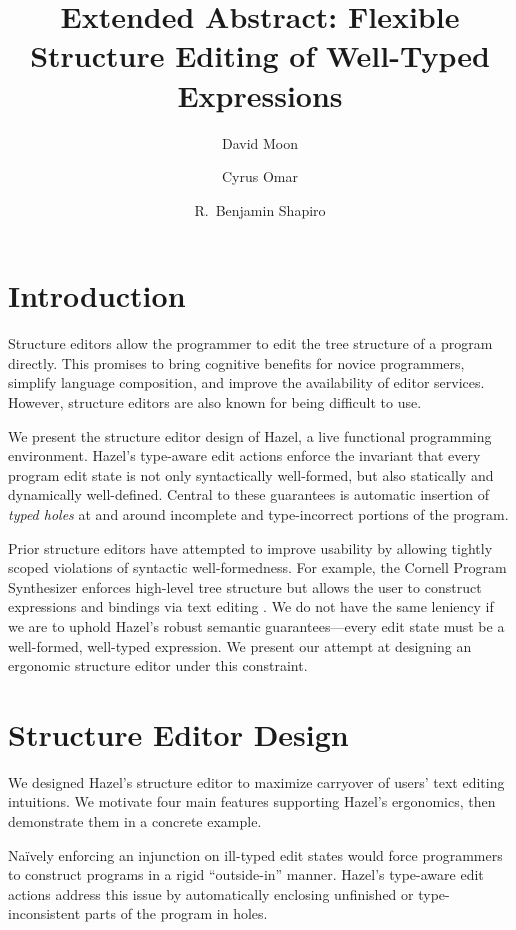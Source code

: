 \documentclass[format=sigplan,dvipsnames,backend=bibtex]{acmart}
\title{Extended Abstract: Flexible Structure Editing of Well-Typed Expressions}
\author{David Moon}
\affiliation{University of Colorado Boulder}
\author{Cyrus Omar}
\affiliation{University of Chicago}
\author{R.~Benjamin Shapiro}
\affiliation{University of Colorado Boulder}
\newcommand{\Hazel}{\textsf{Hazel}\xspace}
\begin{document}
\maketitle

\section{Introduction}

Structure editors allow the programmer to edit the tree structure of a program directly.
This promises to bring cognitive benefits for novice programmers, simplify language composition,
  and improve the availability of editor services.
However, structure editors are also known for being difficult to use.

We present the structure editor design of \Hazel, a live functional programming environment.
	\Hazel's type-aware edit actions enforce the invariant that every program edit state is not only syntactically 
	well-formed, but also statically \cite{Hazelnut} and dynamically \cite{HazelnutLive}
	well-defined.
Central to these guarantees is automatic insertion of \emph{typed holes} at and around 
	incomplete and type-incorrect portions of the program.
	
Prior structure editors have attempted to improve usability by allowing tightly scoped 
	violations of syntactic well-formedness.
For example, the Cornell Program Synthesizer enforces high-level tree structure but
	allows the user to construct expressions and bindings via text editing \cite{Cornell}.
We do not have the same leniency if we are to uphold \Hazel's robust semantic
	guarantees---every edit state must be a well-formed, well-typed expression.
We present our attempt at designing an ergonomic structure editor under this constraint.
	
\section{Structure Editor Design}

We designed \Hazel's structure
	editor to maximize carryover of users' text editing intuitions.
We motivate four main features supporting \Hazel's ergonomics, then demonstrate them
	in a concrete example.
	
\newcommand{\feat}[1]{{\bfseries (#1)}}

Naïvely enforcing an injunction on ill-typed edit states would force programmers to
	construct programs in a rigid ``outside-in'' manner.
\Hazel's type-aware edit actions address this issue by automatically enclosing unfinished
	or type-inconsistent parts of the program in holes.
\end{document}
